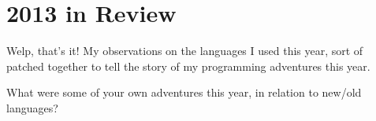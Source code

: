 \documentclass[]{article}
\begin{document}
\hypertarget{in-review}{%
\section{2013 in Review}\label{in-review}}

Welp, that's it! My observations on the languages I used this year, sort of
patched together to tell the story of my programming adventures this year.

What were some of your own adventures this year, in relation to new/old
languages?
\end{document}
